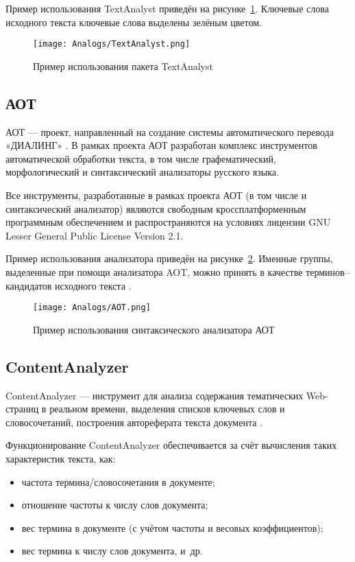 Пример использования TextAnalyst приведён на
рисунке~\ref{fig:Analogs:TextAnalyst}. Ключевые слова исходного
текста ключевые слова выделены зелёным цветом.

\begin{landscape}
\begin{figure}[ht]
  \centering
  \texttt{[image: Analogs/TextAnalyst.png]}
  \caption{Пример использования пакета TextAnalyst}
  \label{fig:Analogs:TextAnalyst}
\end{figure}
\end{landscape}

\subsection{АОТ}
\label{subsec:AOT}
АОТ — проект, направленный на создание системы автоматического
перевода «ДИАЛИНГ» \cite{AOT}. В рамках проекта АОТ разработан
комплекс инструментов автоматической обработки текста, в том числе
графематический, морфологический и синтаксический анализаторы
русского языка.

Все инструменты, разработанные в рамках проекта АОТ (в том числе и
синтаксический анализатор) являются свободным кроссплатформенным
программным обеспечением и распространяются на условиях лицензии
GNU Lesser General Public License Version 2.1.

Пример использования анализатора приведён на
рисунке~\ref{fig:Analogs:AOT}. Именные группы, выделенные при помощи
анализатора AOT, можно принять в качестве терминов--кандидатов
исходного текста \cite{Braslavsky08}.

\begin{landscape}
\begin{figure}[ht]
  \centering
  \texttt{[image: Analogs/AOT.png]}
  \caption{Пример использования синтаксического анализатора АОТ}
  \label{fig:Analogs:AOT}
\end{figure}
\end{landscape}

\subsection{ContentAnalyzer}
\label{subsec:ContentAnalyzer}
ContentAnalyzer — инструмент для анализа содержания тематических
Web-страниц в реальном времени, выделения списков ключевых слов и
словосочетаний, построения автореферата текста документа
\cite{ContentAnalyzer}.

Функционирование ContentAnalyzer обеспечивается за счёт вычисления
таких характеристик текста, как:
\begin{itemize}
  \item частота термина/словосочетания в документе;
  \item отношение частоты к числу слов документа;
  \item вес термина в документе (с учётом частоты и весовых
коэффициентов);
  \item вес термина к числу слов документа, и\ др.
\end{itemize}

